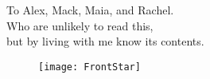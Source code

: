 \thispagestyle{empty}

\vspace*{3cm}

\begin{center}
To Alex, Mack, Maia, and Rachel.\\
Who are unlikely to read this,\\
but by living with me know its contents.
\end{center}

\vfill

\begin{figure}
\centering
\texttt{[image: FrontStar]}
\end{figure}

